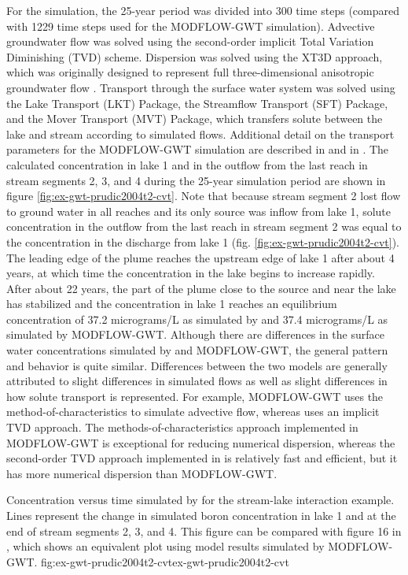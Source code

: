 For the \mf simulation, the 25-year period was divided into 300 time steps (compared with 1229 time steps used for the MODFLOW-GWT simulation).  Advective groundwater flow was solved using the second-order implicit Total Variation Diminishing (TVD) scheme.  Dispersion was solved using the XT3D approach, which was originally designed to represent full three-dimensional anisotropic groundwater flow \citep{modflow6xt3d}.  Transport through the surface water system was solved using the Lake Transport (LKT) Package, the Streamflow Transport (SFT) Package, and the Mover Transport (MVT) Package, which transfers solute between the lake and stream according to simulated flows.  Additional detail on the transport parameters for the MODFLOW-GWT simulation are described in \cite{modflowsfr1pack} and in \cite{modflowlak3pack}.  The calculated concentration in lake 1 and in the outflow from the last reach in stream segments 2, 3, and 4 during the 25-year simulation period are shown in figure \ref{fig:ex-gwt-prudic2004t2-cvt}.  Note that because stream segment 2 lost flow to ground water in all reaches and its only source was inflow from lake 1, solute concentration in the outflow from the last reach in stream segment 2 was equal to the concentration in the discharge from lake 1 (fig. \ref{fig:ex-gwt-prudic2004t2-cvt}).  The leading edge of the plume reaches the upstream edge of lake 1 after about 4 years, at which time the concentration in the lake begins to increase rapidly. After about 22 years, the part of the plume close to the source and near the lake has stabilized and the concentration in lake 1 reaches an equilibrium concentration of 37.2 micrograms/L as simulated by \mf and 37.4 micrograms/L as simulated by MODFLOW-GWT.  Although there are differences in the surface water concentrations simulated by \mf and MODFLOW-GWT, the general pattern and behavior is quite similar.  Differences between the two models are generally attributed to slight differences in simulated flows as well as slight differences in how solute transport is represented.  For example, MODFLOW-GWT uses the method-of-characteristics to simulate advective flow, whereas \mf uses an implicit TVD approach.  The methods-of-characteristics approach implemented in MODFLOW-GWT is exceptional for reducing numerical dispersion, whereas the second-order TVD approach implemented in \mf is relatively fast and efficient, but it has more numerical dispersion than MODFLOW-GWT.  

\begin{StandardFigure}{
                                     Concentration versus time simulated by \mf for the stream-lake interaction example.  Lines represent the change in simulated boron concentration in lake 1 and at the end of stream segments 2, 3, and 4.  This figure can be compared with figure 16 in \cite{modflowsfr1pack}, which shows an equivalent plot using model results simulated by MODFLOW-GWT.
                                     }{fig:ex-gwt-prudic2004t2-cvt}{ex-gwt-prudic2004t2-cvt}
\end{StandardFigure}            

